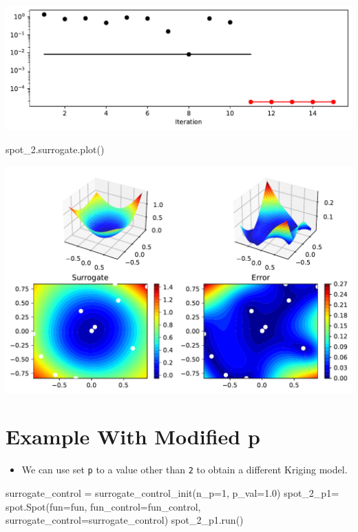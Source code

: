 \documentclass[
  letterpaper,
  DIV=11,
  numbers=noendperiod]{scrreprt}
\newenvironment{Shaded}{\begin{snugshade}}{\end{snugshade}}
\newcommand{\DecValTok}[1]{\textcolor[rgb]{0.68,0.00,0.00}{#1}}
\newcommand{\FloatTok}[1]{\textcolor[rgb]{0.68,0.00,0.00}{#1}}
\newcommand{\NormalTok}[1]{\textcolor[rgb]{0.00,0.23,0.31}{#1}}
\newcommand{\OperatorTok}[1]{\textcolor[rgb]{0.37,0.37,0.37}{#1}}
\providecommand{\tightlist}{%
  \setlength{\itemsep}{0pt}\setlength{\parskip}{0pt}}\usepackage{longtable,booktabs,array}
\begin{document}
\includegraphics{015_num_spot_correlation_p_files/figure-pdf/cell-7-output-1.pdf}

\begin{Shaded}
\begin{Highlighting}[]
\NormalTok{spot\_2.surrogate.plot()}
\end{Highlighting}
\end{Shaded}

\includegraphics{015_num_spot_correlation_p_files/figure-pdf/cell-8-output-1.pdf}

\section{Example With Modified p}\label{example-with-modified-p}

\begin{itemize}
\tightlist
\item
  We can use set \texttt{p} to a value other than \texttt{2} to obtain a
  different Kriging model.
\end{itemize}

\begin{Shaded}
\begin{Highlighting}[]
\NormalTok{surrogate\_control }\OperatorTok{=}\NormalTok{ surrogate\_control\_init(n\_p}\OperatorTok{=}\DecValTok{1}\NormalTok{,}
\NormalTok{                                           p\_val}\OperatorTok{=}\FloatTok{1.0}\NormalTok{)}
\NormalTok{spot\_2\_p1}\OperatorTok{=}\NormalTok{ spot.Spot(fun}\OperatorTok{=}\NormalTok{fun,}
\NormalTok{                    fun\_control}\OperatorTok{=}\NormalTok{fun\_control,}
\NormalTok{                    surrogate\_control}\OperatorTok{=}\NormalTok{surrogate\_control)}
\NormalTok{spot\_2\_p1.run()}
\end{Highlighting}
\end{Shaded}
\end{document}
